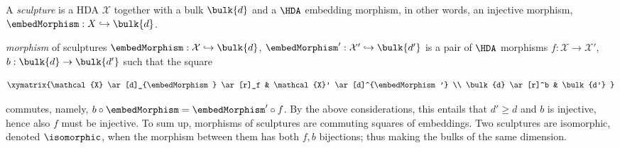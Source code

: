     \begin{definition}[Sculpture]
        \label{def:sculptures}
        A \emph{sculpture} is a HDA $\mathcal{X}$ together with a bulk $\bulk{d}$ and a $\HDA$ embedding morphism, in other words, an injective morphism, $\embedMorphism: X\hookrightarrow \bulk{d}$.
 

        \emph{morphism} of sculptures $\embedMorphism: \mathcal{X} \hookrightarrow \bulk{ d}$, $\embedMorphism': \mathcal{X}' \hookrightarrow \bulk{ d'}$ is a pair of $\HDA$ morphisms $f: \mathcal{X} \to \mathcal{X}'$, $b: \bulk{ d}\to \bulk{ d'}$ such that the square

        \begin{equation*}
            \xymatrix{%
            \mathcal{X} \ar[d]_{\embedMorphism} \ar[r]_f & \mathcal{X}' \ar[d]^{\embedMorphism'}
            \\ \bulk{d} \ar[r]^b & \bulk{d'}
            }
        \end{equation*}

        commutes, namely, $b\circ \embedMorphism= \embedMorphism'\circ f$.  By the above considerations, this entails that $d'\ge d$ and $b$ is injective, hence also $f$ must be injective.  To sum up, morphisms of sculptures are commuting squares of embeddings. Two sculptures are isomorphic, denoted $\isomorphic$, when the morphism between them has both $f,b$ bijections; thus making the bulks of the same dimension.
    \end{definition}

    
